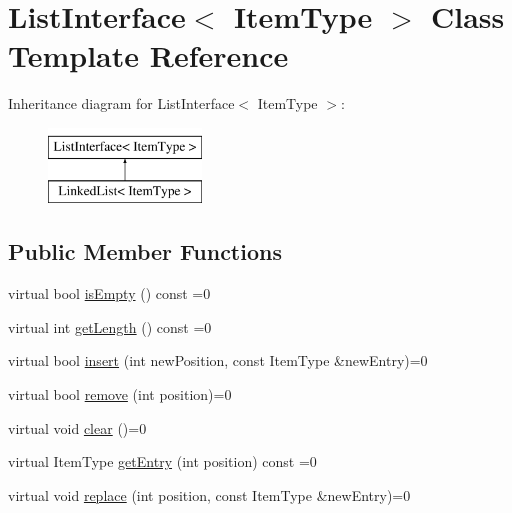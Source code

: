 \hypertarget{class_list_interface}{\section{List\-Interface$<$ Item\-Type $>$ Class Template Reference}
\label{class_list_interface}
}
Inheritance diagram for List\-Interface$<$ Item\-Type $>$\-:\begin{figure}[H]
\begin{center}
\leavevmode
\includegraphics[height=2.000000cm]{class_list_interface}
\end{center}
\end{figure}
\subsection*{Public Member Functions}
\begin{DoxyCompactItemize}
\item 
virtual bool \hyperlink{class_list_interface_a924f91e7f81d7dcd3fda79bbcc671394}{is\-Empty} () const =0
\item 
virtual int \hyperlink{class_list_interface_afc85695d4137f1e29ff02e179c9f3221}{get\-Length} () const =0
\item 
virtual bool \hyperlink{class_list_interface_a5b2f86954a86172699a3495982c38e77}{insert} (int new\-Position, const Item\-Type \&new\-Entry)=0
\item 
virtual bool \hyperlink{class_list_interface_a5543002ec0d64bd2a63f3732f437af65}{remove} (int position)=0
\item 
virtual void \hyperlink{class_list_interface_adfda414908b645bdf19bcab8269168b7}{clear} ()=0
\item 
virtual Item\-Type \hyperlink{class_list_interface_a86987f69e5056d287212ede41db1956a}{get\-Entry} (int position) const =0
\item 
virtual void \hyperlink{class_list_interface_aae877a56b7b9f5f526c37a00e234fad1}{replace} (int position, const Item\-Type \&new\-Entry)=0
\end{DoxyCompactItemize}


